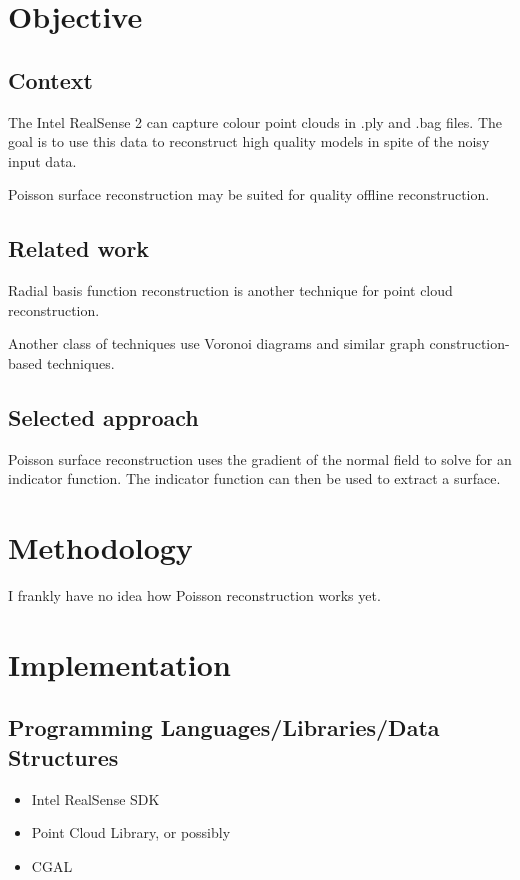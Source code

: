 \documentclass[letterpaper, 10pt]{article}
\begin{document}
\section{Objective}
\subsection{Context}

The Intel RealSense 2 can capture colour point clouds in .ply and .bag files.
The goal is to use this data to reconstruct high quality models in spite
of the noisy input data.

Poisson surface reconstruction \cite{kazhdan2006poisson} may be suited for
quality offline reconstruction.

\subsection{Related work}

Radial basis function reconstruction \cite{carr2001reconstruction} is another technique for
point cloud reconstruction.

Another class of techniques use Voronoi diagrams \cite{amenta1998new} and similar
graph construction-based techniques.

\subsection{Selected approach}

Poisson surface reconstruction uses the gradient of the normal field to solve
for an indicator function. The indicator function can then be used to extract
a surface.

\section{Methodology}

I frankly have no idea how Poisson reconstruction works yet.

\section{Implementation}

\subsection{Programming Languages/Libraries/Data Structures}

\begin{itemize}
  \item Intel RealSense SDK
  \item Point Cloud Library, or possibly
  \item CGAL
\end{itemize}
\end{document}
